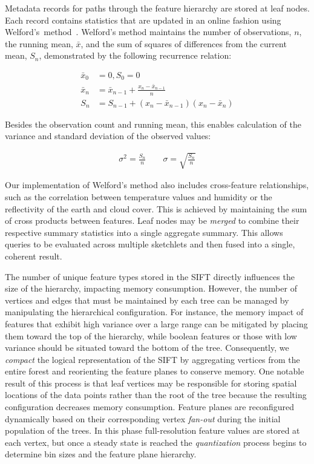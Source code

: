 Metadata records for paths through the feature hierarchy are stored at leaf nodes. Each record contains statistics that are updated in an online fashion using Welford's~method~\cite{welford1962note}. Welford's method maintains the number of observations, $n$, the running mean, $\bar{x}$, and the sum of squares of differences from the current mean, $S_n$, demonstrated by the following recurrence relation:

\begin{align*}
    \bar{x}_0 &= 0, S_0 = 0 \\
    \bar{x}_n &= \bar{x}_{n - 1} + \frac{x_n - \bar{x}_{n - 1}}{n} \\
    S_n       &= S_{n - 1} + (x_n - \bar{x}_{n - 1})(x_n - \bar{x}_n)
\end{align*}

Besides the observation count and running mean, this enables calculation of the variance and standard deviation of the observed values:

\begin{align*}
    \sigma^2 = \frac{S_n}{n} \hspace{2em} \sigma = \sqrt{\frac{S_n}{n}}
\end{align*}

Our implementation of Welford's method also includes cross-feature relationships, such as the correlation between temperature values and humidity or the reflectivity of the earth and cloud cover. This is achieved by maintaining the sum of cross products between features. Leaf nodes may be \emph{merged} to combine their respective summary statistics into a single aggregate summary. This allows queries to be evaluated across multiple sketchlets and then fused into a single, coherent result.

The number of unique feature types stored in the SIFT directly influences the size of the hierarchy, impacting memory consumption. However, the number of vertices and edges that must be maintained by each tree can be managed by manipulating the hierarchical configuration. For instance, the memory impact of features that exhibit high variance over a large range can be mitigated by placing them toward the top of the hierarchy, while boolean features or those with low variance should be situated toward the bottom of the tree. Consequently, we \emph{compact} the logical representation of the SIFT by aggregating vertices from the entire forest and reorienting the feature planes to conserve memory. One notable result of this process is that leaf vertices may be responsible for storing spatial locations of the data points rather than the root of the tree because the resulting configuration decreases memory consumption.  Feature planes are reconfigured dynamically based on their corresponding vertex \emph{fan-out} during the initial population of the trees. In this phase full-resolution feature values are stored at each vertex, but once a steady state is reached the \emph{quantization} process begins to determine bin sizes and the feature plane hierarchy.

